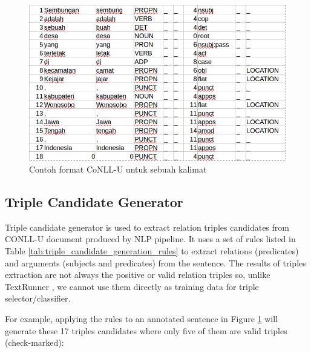 \begin{figure}
\centering
\includegraphics[scale=0.35]{../images/conllu_example.png}
\caption{Contoh format CoNLL-U untuk sebuah kalimat}
\label{fig:conllu_example}
\end{figure}

\subsection{Triple Candidate Generator} \label{Triple Candidate Generator}


Triple candidate generator is used to extract relation triples candidates from CONLL-U document produced by NLP pipeline. It uses a set of rules listed in Table \ref{tab:triple_candidate_generation_rules} to extract relations (predicates) and arguments (subjects and predicates) from the sentence. The results of triples extraction are not always the positive or valid relation triples so, unlike TextRunner \citep{banko2007open}, we cannot use them directly as training data for triple selector/classifier.

For example, applying the rules to an annotated sentence in Figure \ref{fig:conllu_example} will generate these 17 triples candidates where only five of them are valid triples (check-marked):

